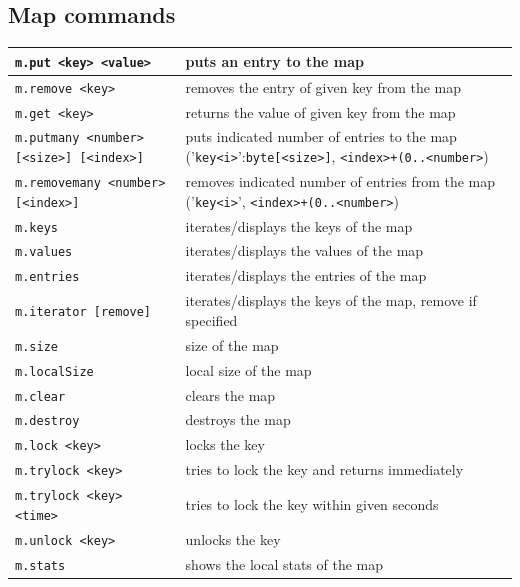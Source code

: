 \subsection*{Map commands}
\begin{tabular}{|p{}|p{}|}
    \hline
    \texttt{m.put <key> <value>} & puts an entry to the map\\\hline
    \texttt{m.remove <key>} & removes the entry of given key from the map\\\hline
    \texttt{m.get <key>} & returns the value of given key from the map\\\hline
    \texttt{m.putmany <number> [<size>] [<index>]} & puts indicated number of entries to the map ('\texttt{key<i>}':\texttt{byte[<size>]}, \texttt{<index>+(0..<number>})\\\hline
    \texttt{m.removemany <number> [<index>]} & removes indicated number of entries from the map ('\texttt{key<i>}', \texttt{<index>+(0..<number>})\\\hline
    \texttt{m.keys} & iterates/displays the keys of the map\\\hline
    \texttt{m.values} & iterates/displays the values of the map\\\hline
    \texttt{m.entries} & iterates/displays the entries of the map\\\hline
    \texttt{m.iterator [remove]} & iterates/displays the keys of the map, remove if specified\\\hline
    \texttt{m.size} & size of the map\\\hline
    \texttt{m.localSize} & local size of the map\\\hline
    \texttt{m.clear} & clears the map\\\hline
    \texttt{m.destroy} & destroys the map\\\hline
    \texttt{m.lock <key>} & locks the key\\\hline
    \texttt{m.trylock <key>} & tries to lock the key and returns immediately\\\hline
    \texttt{m.trylock <key> <time>} & tries to lock the key within given seconds\\\hline
    \texttt{m.unlock <key>} & unlocks the key\\\hline
    \texttt{m.stats} & shows the local stats of the map\\\hline
\end{tabular}
